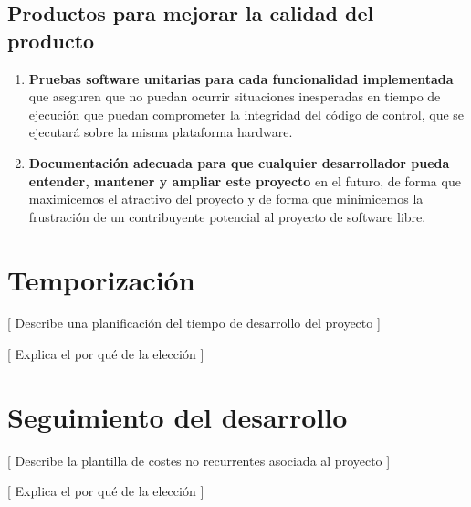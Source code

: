 \subsection{Productos para mejorar la calidad del producto}

\begin{enumerate}
    \item \textbf{Pruebas software unitarias para cada funcionalidad implementada} que aseguren que no
    puedan ocurrir situaciones inesperadas en tiempo
    de ejecución que puedan comprometer la integridad del código de control, que se ejecutará sobre
    la misma plataforma hardware.
    \item \textbf{Documentación adecuada para que cualquier desarrollador pueda entender,
    mantener y ampliar este proyecto} en el futuro, de forma que maximicemos el atractivo
    del proyecto y de forma que minimicemos la frustración de un contribuyente potencial
    al proyecto de software libre.
\end{enumerate}

\section{Temporización}

[ Describe una planificación del tiempo de desarrollo del proyecto ]

[ Explica el por qué de la elección ]

\section{Seguimiento del desarrollo}

[ Describe la plantilla de costes no recurrentes asociada al proyecto ]

[ Explica el por qué de la elección ]
